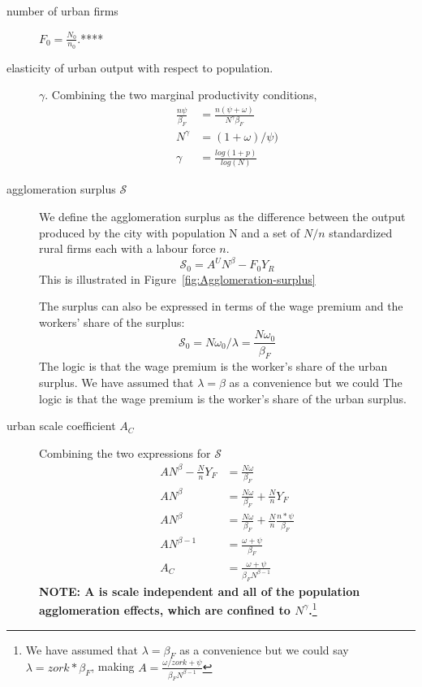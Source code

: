 \begin{description}

\item[number of urban firms] $F_0=\frac{N_0}{n_0}$.****

\item[elasticity of urban output with respect to population.] $\gamma$. Combining the two marginal productivity conditions, 
\begin{align}
\frac{n\psi}{\beta_F}  &= \frac{n(\psi+\omega)}{N^\gamma \beta_F}  \\
N^\gamma &= (1+\omega)/\psi)\\
\gamma &= \frac{log(1+p)}{log(N)}
\end{align}

\item [agglomeration surplus $\mathcal{S}$] We define the agglomeration surplus as the difference between the output produced by  the city with population N and a set of $N/n$ standardized rural firms each with a labour force $n$. 
\[\mathcal{S_0}=A^U N^\beta-F_0Y_R \] 
This is illustrated in Figure~\ref{fig:Agglomeration-surplus}

The surplus can also be expressed in terms of the wage premium and the workers' share of the surplus:
\[\mathcal{S_0}=N\omega_0/\lambda=\frac{N\omega_0}{\beta_F}\] 
The logic is that the wage premium is the worker's share of the urban surplus. We have assumed that $\lambda=\beta$ as a convenience but we could 
The logic is that the wage premium is the worker's share of the urban surplus. 

\item[urban scale coefficient $A_C$] Combining the two expressions for $\mathcal{S}$
\begin{align*}
 AN^\beta-\frac{N}{n}Y_F    &=\frac{N\omega}{\beta_F}\\ 
 AN^\beta   &=\frac{N\omega}{\beta_F} + \frac{N}{n}Y_F \\
 AN^\beta   &=\frac{N\omega}{\beta_F} + \frac{N}{n}\frac{n*\psi}{\beta_F}\\
AN^{\beta-1}   &=\frac{\omega+\psi}{\beta_F}\\ 
  A_C&=\frac{\omega+\psi}{\beta_FN^{\beta-1}}
\end{align*}
\textbf{NOTE: A is scale independent and all of the population agglomeration effects, which are confined to $N^\gamma$.}\footnote{We have assumed that $\lambda=\beta_F$ as a convenience but we could say $\lambda=zork*\beta_F$, making $A=\frac{\omega/zork +\psi}{\beta_FN^{\beta-1}}$ }
\end{description}


